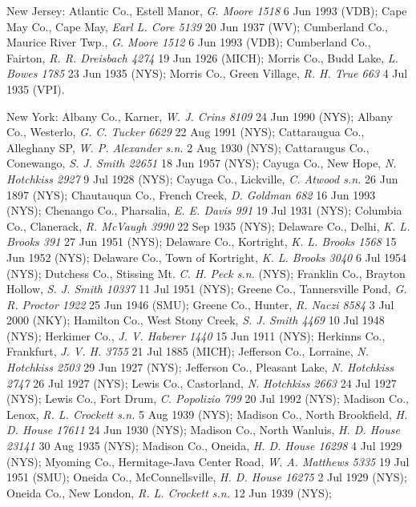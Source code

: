 \documentclass{article}
\begin{document}
New Jersey:
Atlantic Co., Estell Manor, \textit{G. Moore 1518} 6 Jun 1993 (VDB);
Cape May Co., Cape May, \textit{Earl L. Core 5139} 20 Jun 1937 (WV);
Cumberland Co., Maurice River Twp., \textit{G. Moore 1512} 6 Jun 1993 (VDB);
Cumberland Co., Fairton, \textit{R. R. Dreisbach 4274} 19 Jun 1926 (MICH);
Morris Co., Budd Lake, \textit{L. Bowes 1785} 23 Jun 1935 (NYS);
Morris Co., Green Village, \textit{R. H. True 663} 4 Jul 1935 (VPI).

New York:
Albany Co., Karner, \textit{W. J. Crins 8109} 24 Jun 1990 (NYS);
Albany Co., Westerlo, \textit{G. C. Tucker 6629} 22 Aug 1991 (NYS);
Cattaraugua Co., Alleghany SP, \textit{W. P. Alexander s.n.} 2 Aug 1930 (NYS);
Cattaraugus Co., Conewango, \textit{S. J. Smith 22651} 18 Jun 1957 (NYS);
Cayuga Co., New Hope, \textit{N. Hotchkiss 2927} 9 Jul 1928 (NYS);
Cayuga Co., Lickville, \textit{C. Atwood s.n.} 26 Jun 1897 (NYS);
Chautauqua Co., French Creek, \textit{D. Goldman 682} 16 Jun 1993 (NYS);
Chenango Co., Pharsalia, \textit{E. E. Davis 991} 19 Jul 1931 (NYS);
Columbia Co., Clanerack, \textit{R. McVaugh 3990} 22 Sep 1935 (NYS);
Delaware Co., Delhi, \textit{K. L. Brooks 391} 27 Jun 1951 (NYS);
Delaware Co., Kortright, \textit{K. L. Brooks 1568} 15 Jun 1952 (NYS);
Delaware Co., Town of Kortright, \textit{K. L. Brooks 3040} 6 Jul 1954 (NYS);
Dutchess Co., Stissing Mt. \textit{C. H. Peck s.n.} (NYS);
Franklin Co., Brayton Hollow, \textit{S. J. Smith 10337} 11 Jul 1951 (NYS);
Greene Co., Tannersville Pond, \textit{G. R. Proctor 1922} 25 Jun 1946 (SMU);
Greene Co., Hunter, \textit{R. Naczi 8584} 3 Jul 2000 (NKY);
Hamilton Co., West Stony Creek, \textit{S. J. Smith 4469} 10 Jul 1948 (NYS);
Herkimer Co., \textit{J. V. Haberer 1440} 15 Jun 1911 (NYS);
Herkinns Co., Frankfurt, \textit{J. V. H. 3755} 21 Jul 1885 (MICH);
Jefferson Co., Lorraine, \textit{N. Hotchkiss 2503} 29 Jun 1927 (NYS);
Jefferson Co., Pleasant Lake, \textit{N. Hotchkiss 2747} 26 Jul 1927 (NYS);
Lewis Co., Castorland, \textit{N. Hotchkiss 2663} 24 Jul 1927 (NYS);
Lewis Co., Fort Drum, \textit{C. Popolizio 799} 20 Jul 1992 (NYS);
Madison Co., Lenox, \textit{R. L. Crockett s.n.} 5 Aug 1939 (NYS);
Madison Co., North Brookfield, \textit{H. D. House 17611} 24 Jun 1930 (NYS);
Madison Co., North Wanluis, \textit{H. D. House 23141} 30 Aug 1935 (NYS);
Madison Co., Oneida, \textit{H. D. House 16298} 4 Jul 1929 (NYS);
Myoming Co., Hermitage-Java Center Road, \textit{W. A. Matthews 5335} 19 Jul 1951 (SMU);
Oneida Co., McConnellsville, \textit{H. D. House 16275} 2 Jul 1929 (NYS);
Oneida Co., New London, \textit{R. L. Crockett s.n.} 12 Jun 1939 (NYS);
\end{document}
